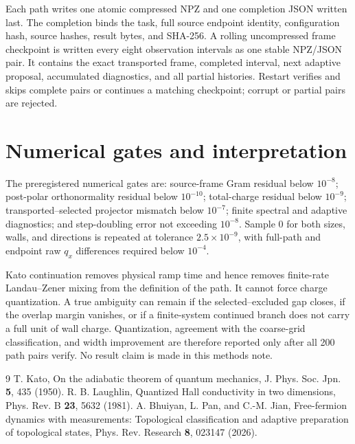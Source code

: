 \documentclass[aps,prb,twocolumn,floatfix,nofootinbib,superscriptaddress]{revtex4-2}
\begin{document}
Each path writes one atomic compressed NPZ and one completion JSON written
last.  The completion binds the task, full source endpoint identity,
configuration hash, source hashes, result bytes, and SHA-256.  A rolling
uncompressed frame checkpoint is written every eight observation intervals
as one stable NPZ/JSON pair.  It contains the exact transported frame,
completed interval, next adaptive proposal, accumulated diagnostics, and all
partial histories.  Restart verifies and skips complete pairs or continues a
matching checkpoint; corrupt or partial pairs are rejected.

\section{Numerical gates and interpretation}

The preregistered numerical gates are: source-frame Gram residual below
$10^{-8}$; post-polar orthonormality residual below $10^{-10}$; total-charge
residual below $10^{-9}$; transported--selected projector mismatch below
$10^{-7}$; finite spectral and adaptive diagnostics; and step-doubling error
not exceeding $10^{-8}$.  Sample 0 for both sizes, walls, and directions is
repeated at tolerance $2.5\times10^{-9}$, with full-path and endpoint raw
$q_x$ differences required below $10^{-4}$.

Kato continuation removes physical ramp time and hence removes finite-rate
Landau--Zener mixing from the definition of the path.  It cannot force charge
quantization.  A true ambiguity can remain if the selected--excluded gap
closes, if the overlap margin vanishes, or if a finite-system continued branch
does not carry a full unit of wall charge.  Quantization, agreement with the
coarse-grid classification, and width improvement are therefore reported
only after all 200 path pairs verify.  No result claim is made in this methods
note.

\begin{thebibliography}{9}
T. Kato, On the adiabatic theorem of quantum mechanics,
J. Phys. Soc. Jpn. \textbf{5}, 435 (1950).
R. B. Laughlin, Quantized Hall conductivity in two dimensions,
Phys. Rev. B \textbf{23}, 5632 (1981).
A. Bhuiyan, L. Pan, and C.-M. Jian, Free-fermion dynamics with measurements:
Topological classification and adaptive preparation of topological states,
Phys. Rev. Research \textbf{8}, 023147 (2026).
\end{thebibliography}
\end{document}
